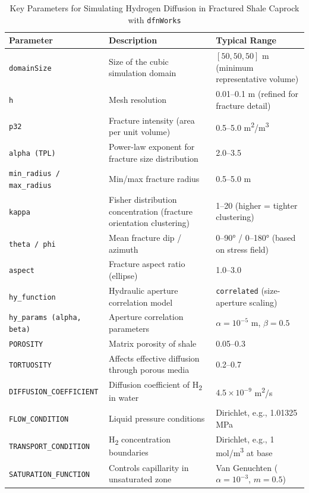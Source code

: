\documentclass{article}
\begin{document}
\begin{table}[htbp]
\centering
\small
\caption{Key Parameters for Simulating Hydrogen Diffusion in Fractured Shale Caprock with \texttt{dfnWorks}}
\begin{tabular}{@{}p{4cm}p{7cm}p{3.5cm}@{}}
\toprule
\textbf{Parameter} & \textbf{Description} & \textbf{Typical Range} \\
\midrule
\texttt{domainSize} & Size of the cubic simulation domain & $[50, 50, 50]$ m (minimum representative volume) \\
\texttt{h} & Mesh resolution & 0.01--0.1 m (refined for fracture detail) \\
\texttt{p32} & Fracture intensity (area per unit volume) & 0.5--5.0 m\textsuperscript{2}/m\textsuperscript{3} \\
\texttt{alpha (TPL)} & Power-law exponent for fracture size distribution & 2.0--3.5 \\
\texttt{min\_radius / max\_radius} & Min/max fracture radius & 0.5--5.0 m \\
\texttt{kappa} & Fisher distribution concentration (fracture orientation clustering) & 1--20 (higher = tighter clustering) \\
\texttt{theta / phi} & Mean fracture dip / azimuth & 0--90° / 0--180° (based on stress field) \\
\texttt{aspect} & Fracture aspect ratio (ellipse) & 1.0–3.0 \\
\texttt{hy\_function} & Hydraulic aperture correlation model & \texttt{correlated} (size-aperture scaling) \\
\texttt{hy\_params (alpha, beta)} & Aperture correlation parameters & $\alpha = 10^{-5}$ m, $\beta = 0.5$ \\
\texttt{POROSITY} & Matrix porosity of shale & 0.05–0.3 \\
\texttt{TORTUOSITY} & Affects effective diffusion through porous media & 0.2–0.7 \\
\texttt{DIFFUSION\_COEFFICIENT} & Diffusion coefficient of H\textsubscript{2} in water & $4.5 \times 10^{-9}$ m\textsuperscript{2}/s \\
\texttt{FLOW\_CONDITION} & Liquid pressure conditions & Dirichlet, e.g., 1.01325 MPa \\
\texttt{TRANSPORT\_CONDITION} & H\textsubscript{2} concentration boundaries & Dirichlet, e.g., 1 mol/m\textsuperscript{3} at base \\
\texttt{SATURATION\_FUNCTION} & Controls capillarity in unsaturated zone & Van Genuchten ($\alpha=10^{-3}$, $m=0.5$) \\
\bottomrule
\end{tabular}
\label{tab:dfnWorksParam}
\end{table}
\end{document}
